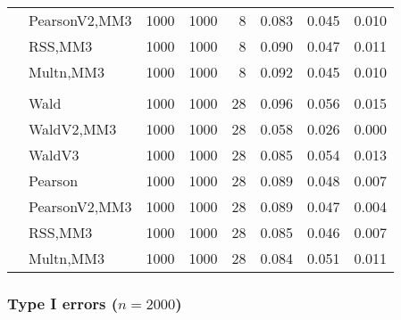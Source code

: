 \documentclass[
]{article}
\begin{document}
\begin{table}[H]
{\begin{tabular}[t]{llrrrrrr}
\hspace{1em} & PearsonV2,MM3 & 1000 & 1000 & 8 & 0.083 & 0.045 & 0.010\\

\hspace{1em} & RSS,MM3 & 1000 & 1000 & 8 & 0.090 & 0.047 & 0.011\\

\hspace{1em} & Multn,MM3 & 1000 & 1000 & 8 & 0.092 & 0.045 & 0.010\\
\cmidrule{1-8}
\addlinespace[0.3em]
\multicolumn{8}{l}{\textbf{3F 15V}}\\
\hspace{1em} & Wald & 1000 & 1000 & 28 & 0.096 & 0.056 & 0.015\\

\hspace{1em} & WaldV2,MM3 & 1000 & 1000 & 28 & 0.058 & 0.026 & 0.000\\

\hspace{1em} & WaldV3 & 1000 & 1000 & 28 & 0.085 & 0.054 & 0.013\\

\hspace{1em} & Pearson & 1000 & 1000 & 28 & 0.089 & 0.048 & 0.007\\

\hspace{1em} & PearsonV2,MM3 & 1000 & 1000 & 28 & 0.089 & 0.047 & 0.004\\

\hspace{1em} & RSS,MM3 & 1000 & 1000 & 28 & 0.085 & 0.046 & 0.007\\

\hspace{1em} & Multn,MM3 & 1000 & 1000 & 28 & 0.084 & 0.051 & 0.011\\
\bottomrule
\end{tabular}}
\end{table}

\hypertarget{type-i-errors-n2000}{%
\subsubsection{\texorpdfstring{Type I errors
(\(n=2000\))}{Type I errors (n=2000)}}\label{type-i-errors-n2000}}
\end{document}
